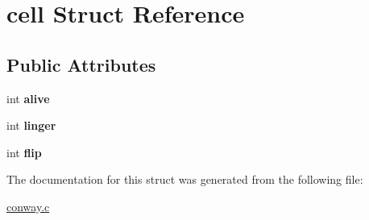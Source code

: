 \hypertarget{structcell}{\section{cell Struct Reference}
\label{structcell}
}
\subsection*{Public Attributes}
\begin{DoxyCompactItemize}
\item 
\hypertarget{structcell_a25a19f18f9a0ef3e81e6f208eed6e0a0}{int {\bfseries alive}}\label{structcell_a25a19f18f9a0ef3e81e6f208eed6e0a0}

\item 
\hypertarget{structcell_a20790d9699bcd286ee47553d61fe2a44}{int {\bfseries linger}}\label{structcell_a20790d9699bcd286ee47553d61fe2a44}

\item 
\hypertarget{structcell_aa178aa4858f41c25f29c2ba7906ec2b1}{int {\bfseries flip}}\label{structcell_aa178aa4858f41c25f29c2ba7906ec2b1}

\end{DoxyCompactItemize}


The documentation for this struct was generated from the following file\-:\begin{DoxyCompactItemize}
\item 
\hyperlink{conway_8c}{conway.\-c}\end{DoxyCompactItemize}
